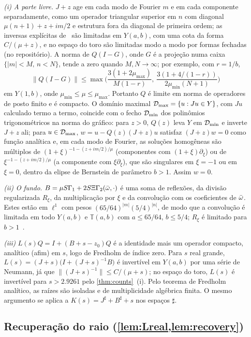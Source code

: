 \emph{(i) A parte livre.} $J+z$ age em cada modo de Fourier $m$ e em cada componente separadamente, como um operador
triangular superior em $n$ com diagonal $\mu(n+1)+z+im/2$ e estrutura fora da diagonal de primeira ordem; as inversas
explícitas de~\cite[\S3]{RT2019} são limitadas em $Y(a,b)$, com uma cota da forma $C/(\mu+z)$, e no espaço do toro são
limitadas modo a modo por formas fechadas (no repositório). A norma de $Q(I-G)$, onde $G$ é a projeção
numa caixa $\{|m|<M,\,n<N\}$, tende a zero quando $M,N\to\infty$; por exemplo, com $r=1/b$,
\[
  \|Q(I-G)\|\le\max\Big(\frac{3(1+2\mu_{\max})}{M(1-r)},\ \frac{3(1+4/(1-r))}{2\mu_{\min}(N+1)}\Big)
\]
em $Y(1,b)$, onde $\mu_{\min}\le\mu\le\mu_{\max}$. Portanto $Q$ é limite em norma de operadores de posto finito e é compacto.
O domínio maximal $\mathcal{D}_{\max}=\{u:Ju\in Y\}$, com $Ju$ calculado termo a termo, coincide com o fecho
$\mathcal{D}_{\min}$ dos polinômios trigonométricos na norma do gráfico: para $z>0$, $Q(z)$ leva $Y$ em $\mathcal{D}_{\min}$ e
inverte $J+z$ ali; para $u\in\mathcal{D}_{\max}$, $w=u-Q(z)(J+z)u$ satisfaz $(J+z)w=0$ como função analítica e, em
cada modo de Fourier, as soluções homogêneas são múltiplos de $(1+\xi)^{-1-(z+im/2)/\mu}$ (componentes com
$(1+\xi)\partial_\xi$) ou de $\xi^{-1-(z+im/2)/\mu}$ (a componente com $\xi\partial_\xi$), que são singulares em
$\xi=-1$ ou em $\xi=0$, dentro da elipse de Bernstein de parâmetro $b>1$. Assim $w=0$.

\emph{(ii) O fundo.} $B=\mu S\Gamma_1+2S\Xi\Gamma_2(\bar\omega,\cdot)$ é uma soma de reflexões, da divisão regularizada
$R_\xi$, da multiplicação por $\xi$ e da convolução com os coeficientes de $\bar\omega$. Estes estão em
$\ell^1$ com pesos $(65/64)^{|m|}(5/4)^{|n|}$, de modo que a convolução é limitada em todo $Y(a,b)$ e $\mathbb T(a,b)$
com $a\le65/64$, $b\le5/4$; $R_\xi$ é limitado para $b>1$~\cite[\S4]{RT2019}.

\emph{(iii)} $L(s)Q=I+(B+s-z_0)Q$ é a identidade mais um operador compacto, analítico (afim) em $s$, logo de Fredholm de
índice zero. Para $s$ real grande, $L(s)=(J+s)\big(I+(J+s)^{-1}B\big)$ é invertível em $Y(a,b)$ por uma série de Neumann, já que
$\|(J+s)^{-1}\|\le C/(\mu+s)$; no espaço do toro, $L(s)$ é invertível para $s>2.9261$ pelo \cref{thm:counts}~(i). Pelo teorema
de Fredholm analítico, as raízes são isoladas e de multiplicidade algébrica finita. O mesmo
argumento se aplica a $K(s)=J^\sharp+B^\sharp+s$ nos espaços $\sharp$.

\subsection{Recuperação do raio (\cref{lem:Lreal,lem:recovery})}\label{app:recovery}

